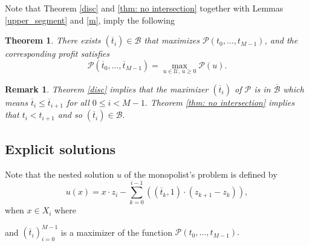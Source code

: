 \documentclass[12pt,reqno]{amsart}
\newtheorem{theorem}{Theorem}
\newtheorem{remark}{Remark}
\begin{document}
    Note that Theorem \ref{disc} and \ref{thm: no intersection} together with Lemmas \ref{upper_segment} and \ref{m},  imply the following 
\begin{theorem}\label{p(t)}
There exists $(\overline{t}_i)\in \mathcal{B}$ that maximizes $\mathcal{P}(t_0,\dots , t_{M-1})$, 
and the corresponding profit satisfies
\begin{equation}\label{Eqn: reformuation problem}
\mathcal{P}(\overline{t}_0,\dots, \overline{t}_{M-1})
=\max_{u\in \mathcal{U},\, u\ge 0}\mathcal{P}(u).
\end{equation}
\end{theorem}

\begin{remark}
    Theorem \ref{disc} implies that the maximizer $(\overline{t}_i)$ of $\mathcal{P}$ is in $\overline{\mathcal{B}}$ which means  $\overline{t}_i\le \overline{t}_{i+1}$ for all $0\le i<M-1.$ Theorem \ref{thm: no intersection} implies that $t_i<t_{i+1}$ and so $(\overline{t}_i)\in \mathcal{B}.$
\end{remark}

\subsection{Explicit solutions}\label{subsect: explicit solution}
 Note that the nested solution $u$ of the monopolist's problem is defined by
    \[u(x)=x\cdot z_i-\sum_{k=0}^{i-1}((\overline{t}_{k},1)\cdot (z_{k+1}-z_{k})),\]
    when $x\in X_i$ where
\vspace{5pt}

\vspace{5pt}    

and $(\overline{t}_i)_{i=0}^{M-1}$ is a maximizer of the function $\mathcal{P}(t_0,\dots,t_{M-1}).$
\end{document}
